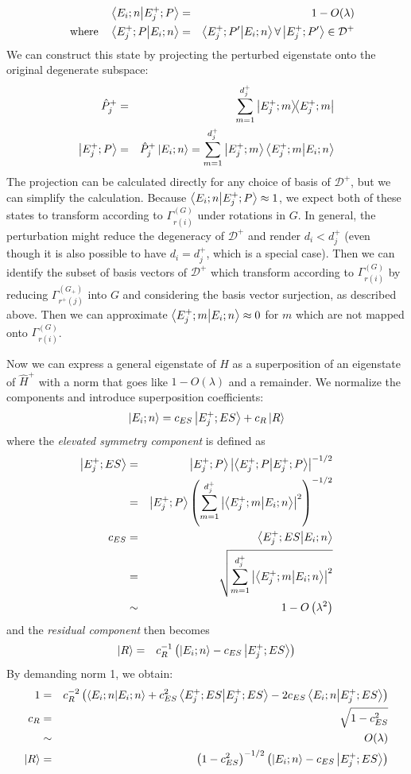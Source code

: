 \documentclass[12pt]{article}
\begin{document}
	\begin{eqnarray*}
	\braket{E_i;n}{E^+_j;P}&=&1-O(\lambda)\\
	\qq{where} \braket{E^+_j;P}{E_i;n}&=&\braket{E^+_j;P'}{E_i;n}\forall \ket{E^+_j;P'}\in\mathcal{D}^+
	\end{eqnarray*}
	We can construct this state by projecting the perturbed eigenstate onto the original degenerate subspace:
	\begin{eqnarray*}
	\hat{P}^+_j&=&\sum_{m=1}^{d^+_j}\dyad{E^+_j;m}{E^+_j;m}\\
	\ket{E^+_j;P}&=&\hat{P}^+_j\ket{E_i;n}=\sum_{m=1}^{d^+_j}\ket{E^+_j;m}\braket{E^+_j;m}{E_i;n}
	\end{eqnarray*}
	The projection can be calculated directly for any choice of basis of $\mathcal{D}^+$, but we can simplify the calculation. Because $\braket{E_i;n}{E^+_j;P}\approx 1$, we expect both of these states to transform according to $\Gamma^{(G)}_{r(i)}$ under rotations in $G$. In general, the perturbation might reduce the degeneracy of $\mathcal{D}^+$ and render $d_i<d^+_j$ (even though it is also possible to have $d_i=d^+_j$, which is a special case). Then we can identify the subset of basis vectors of $\mathcal{D}^+$ which transform according to 	$\Gamma^{(G)}_{r(i)}$ by reducing $\Gamma^{(G_+)}_{r^+(j)}$ into $G$ and considering the basis vector surjection, as described above. Then we can approximate $\braket{E^+_j;m}{E_i;n}\approx 0$ for $m$ which are not mapped onto $\Gamma^{(G)}_{r(i)}$.
	
	Now we can express a general eigenstate of $\hat{H}$ as a superposition of an eigenstate of $\hat{H}^+$ with a norm that goes like $1-O(\lambda)$ and a remainder. We normalize the components and introduce superposition coefficients:
	$$\ket{E_i;n}=c_{ES}\ket{E^+_j;ES}+c_R\ket{R}$$
	where the \textit{elevated symmetry component} is defined as
	\begin{eqnarray*}
	\ket{E^+_j;ES}&=&\ket{E^+_j;P}\abs{\braket{E^+_j;P}{E^+_j;P}}^{-1/2}\\
	&=&\ket{E^+_j;P}\left(\sum_{m=1}^{d^+_j}\abs{\braket{E^+_j;m}{E_i;n}}^2\right)^{-1/2}\\
	c_{ES}&=&\braket{E^+_j;ES}{E_i;n}\\
	&=&\sqrt{\sum_{m=1}^{d^+_j}\abs{\braket{E^+_j;m}{E_i;n}}^2}\\
	&\sim& 1-O\left(\lambda^2\right)
	\end{eqnarray*}
	and the \textit{residual component} then becomes
	\begin{eqnarray*}
	\ket{R}&=&c_R^{-1}\left(\ket{E_i;n}-c_{ES}\ket{E^+_j;ES}\right)
	\end{eqnarray*}
	By demanding norm 1, we obtain:
	\begin{eqnarray*}
	1&=&c_R^{-2}\left(\braket{E_i;n}{E_i;n}+c_{ES}^2\braket{E^+_j;ES}{E^+_j;ES}-2c_{ES}\braket{E_i;n}{E^+_j;ES}\right)\\
	c_R&=&\sqrt{1-c_{ES}^2}\\
	&\sim & O(\lambda)\\
	\ket{R}&=& \left(1-c_{ES}^2\right)^{-1/2}\left(\ket{E_i;n}-c_{ES}\ket{E^+_j;ES}\right)
	\end{eqnarray*}
	
\end{document}
